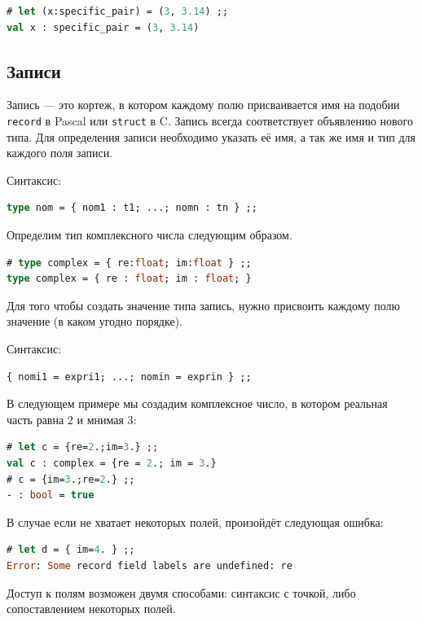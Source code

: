 \begin{lstlisting}[language=OCaml]
# let (x:specific_pair) = (3, 3.14) ;;
val x : specific_pair = (3, 3.14)
\end{lstlisting}

\subsection{Записи}

Запись --- это кортеж, в котором каждому полю присваивается имя на подобии
\texttt{record} в Pascal или \texttt{struct} в C. Запись всегда соответствует
объявлению нового типа. Для определения записи необходимо указать её имя, а так
же имя и тип для каждого поля записи.

Синтаксис:

\begin{lstlisting}[language=OCaml]
type nom = { nom1 : t1; ...; nomn : tn } ;;
\end{lstlisting}

Определим тип комплексного числа следующим образом. 

\begin{lstlisting}[language=OCaml]
# type complex = { re:float; im:float } ;;
type complex = { re : float; im : float; }
\end{lstlisting}

Для того чтобы создать значение типа запись, нужно присвоить каждому полю
значение (в каком угодно порядке).

Синтаксис:

\begin{lstlisting}[language=OCaml]
{ nomi1 = expri1; ...; nomin = exprin } ;;
\end{lstlisting}

В следующем примере мы создадим комплексное число, в котором реальная часть
равна 2 и мнимая 3:

\begin{lstlisting}[language=OCaml]
# let c = {re=2.;im=3.} ;;
val c : complex = {re = 2.; im = 3.}
# c = {im=3.;re=2.} ;;
- : bool = true
\end{lstlisting}

В случае если не хватает некоторых полей, произойдёт следующая ошибка:

\begin{lstlisting}[language=OCaml]
# let d = { im=4. } ;;
Error: Some record field labels are undefined: re
\end{lstlisting}

Доступ к полям возможен двумя способами: синтаксис с точкой, либо сопоставлением
некоторых полей.

